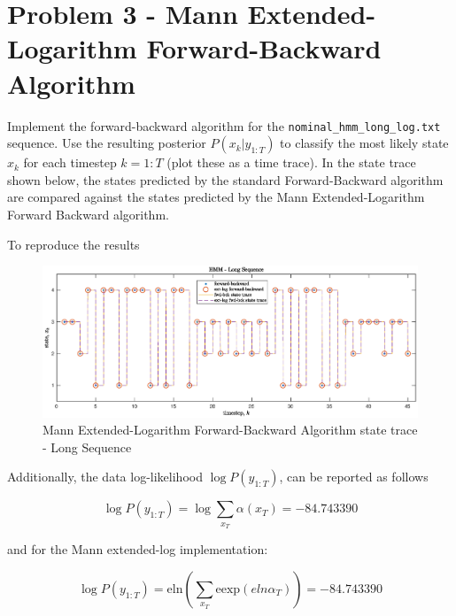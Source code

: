 \documentclass[]{article}
\begin{document}
\section*{Problem 3 - Mann Extended-Logarithm Forward-Backward Algorithm}

Implement the forward-backward algorithm for the \texttt{nominal\_hmm\_long\_log.txt} sequence. Use the resulting posterior $P(x_k \vert y_{1:T})$ to classify the most likely state $x_k$ for each timestep $k=1:T$ (plot these as a time trace). In the state trace shown below, the states predicted by the standard Forward-Backward algorithm are compared against the states predicted by the Mann Extended-Logarithm Forward Backward algorithm.

To reproduce the results 

\begin{figure}[H]
	\begin{center}  
		\includegraphics[scale=0.53]{p3_state_trace_2.eps}  
		\caption{Mann Extended-Logarithm Forward-Backward Algorithm state trace - Long Sequence}
		\label{fig:short_fb}
	\end{center}  
\end{figure}

Additionally, the data log-likelihood $\log P(y_{1:T})$, can be reported as follows

\begin{equation}
	\log P(y_{1:T}) = \log \sum_{x_T} \alpha(x_T) = -84.743390
\end{equation}

and for the Mann extended-log implementation:

\begin{equation}
\log P(y_{1:T}) = \text{eln}\left( \sum_{x_T} \text{eexp}\left(eln\alpha_T\right) \right) = -84.743390
\end{equation}

\newpage
\end{document}

